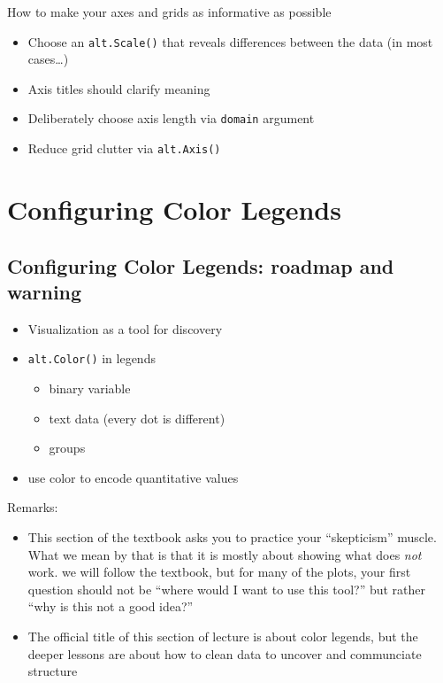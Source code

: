 \documentclass[
  letterpaper,
  DIV=11,
  numbers=noendperiod]{scrartcl}
\providecommand{\tightlist}{%
  \setlength{\itemsep}{0pt}\setlength{\parskip}{0pt}}\usepackage{longtable,booktabs,array}
\begin{document}
How to make your axes and grids as informative as possible

\begin{itemize}
\tightlist
\item
  Choose an \texttt{alt.Scale()} that reveals differences between the
  data (in most cases\ldots)
\item
  Axis titles should clarify meaning
\item
  Deliberately choose axis length via \texttt{domain} argument
\item
  Reduce grid clutter via \texttt{alt.Axis()}
\end{itemize}

\section{Configuring Color Legends}\label{configuring-color-legends}

\subsection{Configuring Color Legends: roadmap and
warning}\label{configuring-color-legends-roadmap-and-warning}

\begin{itemize}
\tightlist
\item
  Visualization as a tool for discovery
\item
  \texttt{alt.Color()} in legends

  \begin{itemize}
  \tightlist
  \item
    binary variable
  \item
    text data (every dot is different)
  \item
    groups
  \end{itemize}
\item
  use color to encode quantitative values
\end{itemize}

Remarks:

\begin{itemize}
\tightlist
\item
  This section of the textbook asks you to practice your ``skepticism''
  muscle. What we mean by that is that it is mostly about showing what
  does \emph{not} work. we will follow the textbook, but for many of the
  plots, your first question should not be ``where would I want to use
  this tool?'' but rather ``why is this not a good idea?''
\item
  The official title of this section of lecture is about color legends,
  but the deeper lessons are about how to clean data to uncover and
  communciate structure
\end{itemize}
\end{document}
